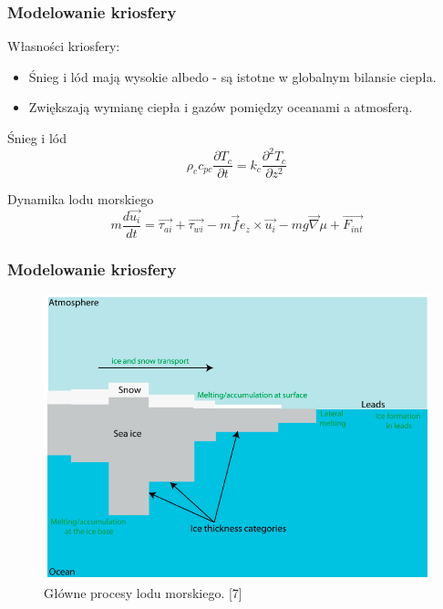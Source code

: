 \documentclass{beamer}
\begin{document}
\begin{frame}
	\frametitle{Modelowanie kriosfery}
	Własności kriosfery:
	\begin{itemize}
		\item Śnieg i lód mają wysokie albedo - są istotne w globalnym bilansie ciepła. 
		\item Zwiększają wymianę ciepła i gazów pomiędzy oceanami a atmosferą.
	\end{itemize}
\begin{block}{Śnieg i lód}
\[ \rho_c c_{pc} \frac{\partial T_c}{\partial t} = k_c \frac{\partial^2 T_c}{\partial z^2}	
\]	
\end{block}
\begin{block}{Dynamika lodu morskiego}
\[ m\frac{d\vec{u_i}}{dt	} = \vec{\tau_{ai}} + \vec{\tau_{wi}} -m\vec{f}e_z\times\vec{u_i} - mg\vec{\nabla}\mu + \vec{F_{int}} 
\]	
\end{block}

	
\end{frame}
\begin{frame}
	\frametitle{Modelowanie kriosfery}
				\begin{figure}[h]
				\begin{center}
					\includegraphics[width=0.8\linewidth]{images/ice.png}
					\caption{Główne procesy lodu morskiego. [7]}
				\end{center}
			\end{figure}
	
\end{frame}
\end{document}
